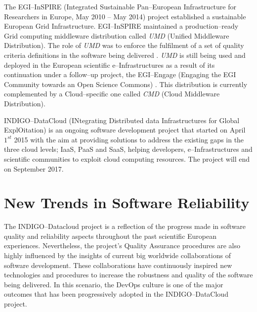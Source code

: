 \documentclass[journal]{IEEEtran}
\begin{document}
The EGI--InSPIRE (Integrated Sustainable Pan--European Infrastructure for Researchers in Europe, May 2010 -- May 2014) project \cite{cordis:egi-inspire} established a sustainable European Grid Infrastructure. EGI--InSPIRE maintained a production--ready Grid computing middleware distribution called {\sl UMD} (Unified Middleware Distribution). The role of {\sl UMD} was to enforce the fulfilment of a set of quality criteria definitions \cite{egi-qc} in the software being delivered \cite{mario}. {\sl UMD} is still being used and deployed in the European scientific e--Infrastructures as a result of its continuation under a follow--up project, the EGI--Engage (Engaging the EGI Community towards an Open Science Commons) \cite{cordis:egi-engage}. This distribution is currently complemented by a Cloud--specific one called {\sl CMD} (Cloud Middleware Distribution).


INDIGO--DataCloud (INtegrating Distributed data Infrastructures for Global ExplOitation) \cite{cordis:indigo} is an ongoing software development project that started on April $1^{st}$ 2015 with the aim at providing solutions to address the existing gaps in the three cloud levels; IaaS, PaaS and SaaS, helping developers, e--Infrastructures and scientific communities to exploit cloud computing resources. The project will end on September 2017.

\section{New Trends in Software Reliability}

The INDIGO--Datacloud project is a reflection of the progress made in software quality and reliability aspects throughout the past scientific European experiences. Nevertheless, the project’s Quality Assurance procedures are also highly influenced by the insights of current big worldwide collaborations of software development. These collaborations have continuously inspired new technologies and procedures to increase the robustness and quality of the software being delivered. In this scenario, the DevOps culture is one of the major outcomes that has been progressively adopted in the INDIGO--DataCloud project.
\end{document}
